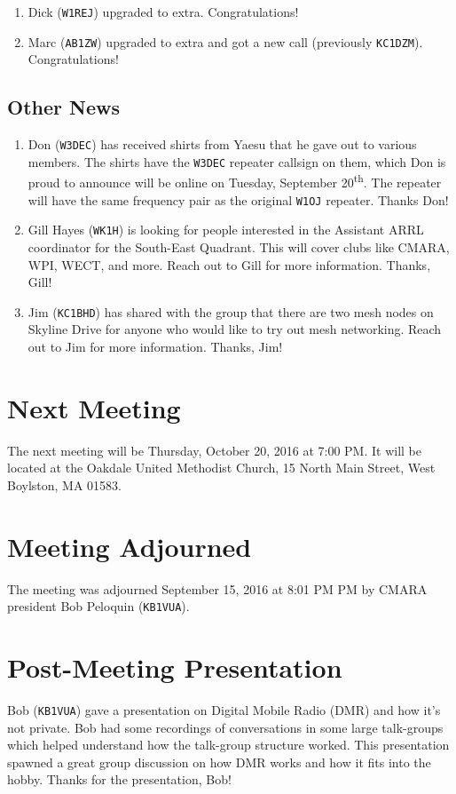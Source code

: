 \documentclass[10pt,letterpaper]{article}
\begin{document}
\begin{enumerate}
\item Dick (\texttt{W1REJ}) upgraded to extra. Congratulations!
\item Marc (\texttt{AB1ZW}) upgraded to extra and got a new call (previously \texttt{KC1DZM}). Congratulations!
\end{enumerate}

\subsection{Other News}

\begin{enumerate}
\item Don (\texttt{W3DEC}) has received shirts from Yaesu that he gave out to various members. The shirts have the \texttt{W3DEC} repeater callsign on them, which Don is proud to announce will be online on Tuesday, September 20\textsuperscript{th}. The repeater will have the same frequency pair as the original \texttt{W1OJ} repeater. Thanks Don!
\item Gill Hayes (\texttt{WK1H}) is looking for people interested in the Assistant ARRL coordinator for the South-East Quadrant. This will cover clubs like CMARA, WPI, WECT, and more. Reach out to Gill for more information. Thanks, Gill!
\item Jim (\texttt{KC1BHD}) has shared with the group that there are two mesh nodes on Skyline Drive for anyone who would like to try out mesh networking. Reach out to Jim for more information. Thanks, Jim!
\end{enumerate}

\section{Next Meeting}

The next meeting will be Thursday, October 20, 2016 at 7:00 PM. It will be located at the Oakdale United Methodist Church, 15 North Main Street, West Boylston, MA 01583.

\section{Meeting Adjourned}
The meeting was adjourned September 15, 2016 at 8:01 PM PM by CMARA president Bob Peloquin (\texttt{KB1VUA}).

\section{Post-Meeting Presentation}

Bob (\texttt{KB1VUA}) gave a presentation on Digital Mobile Radio (DMR) and how it's not private. Bob had some recordings of conversations in some large talk-groups which helped understand how the talk-group structure worked. This presentation spawned a great group discussion on how DMR works and how it fits into the hobby. Thanks for the presentation, Bob!
\end{document}
